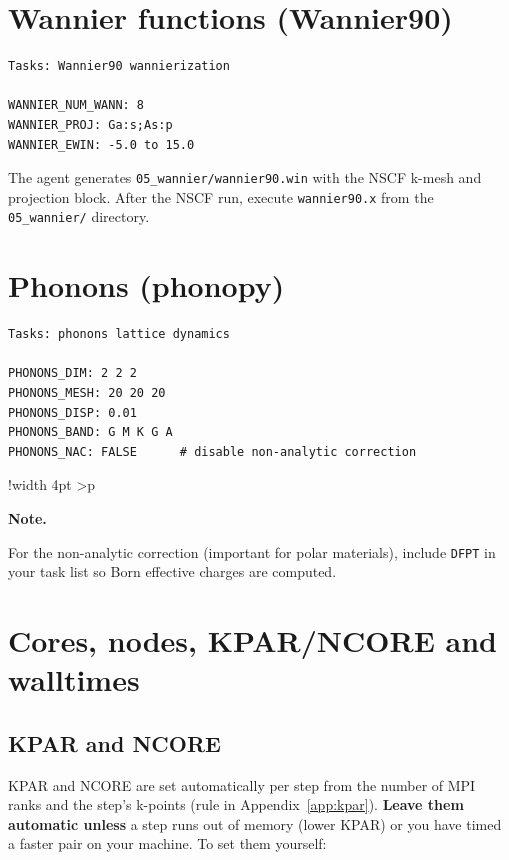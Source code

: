 \documentclass[11pt,a4paper]{scrartcl}
\newlength{\boxwidth}
\newenvironment{notebox}{%
  \par\vspace{6pt}%
  \setlength{\tabcolsep}{5pt}%
  \setlength{\boxwidth}{\dimexpr\linewidth - 4pt - 2\tabcolsep}%
  \noindent\begin{tabular}{!{\color{notebar}\vrule width 4pt}%
      >{\columncolor{notebg}}p{\boxwidth}}%
  \rule{0pt}{11pt}\textbf{\textcolor{notebar}{Note.}}\enspace\ignorespaces%
}{%
  \rule[-4pt]{0pt}{4pt}%
  \end{tabular}\par\vspace{6pt}%
}
\begin{document}
\section{Wannier functions (Wannier90)}
\label{sec:wannier}


\begin{lstlisting}
Tasks: Wannier90 wannierization

WANNIER_NUM_WANN: 8
WANNIER_PROJ: Ga:s;As:p
WANNIER_EWIN: -5.0 to 15.0
\end{lstlisting}

The agent generates \texttt{05\_wannier/wannier90.win} with the NSCF
k-mesh and projection block.  After the NSCF run, execute
\texttt{wannier90.x} from the \texttt{05\_wannier/} directory.

\section{Phonons (phonopy)}
\label{sec:phonons}

\begin{lstlisting}
Tasks: phonons lattice dynamics

PHONONS_DIM: 2 2 2
PHONONS_MESH: 20 20 20
PHONONS_DISP: 0.01
PHONONS_BAND: G M K G A
PHONONS_NAC: FALSE      # disable non-analytic correction
\end{lstlisting}

\begin{notebox}
For the non-analytic correction (important for polar materials), include
\texttt{DFPT} in your task list so Born effective charges are computed.
\end{notebox}

\section{Cores, nodes, KPAR/NCORE and walltimes}
\label{sec:resources}

\subsection{KPAR and NCORE}

KPAR and NCORE are set automatically per step from the number of MPI ranks and the step's k-points (rule in Appendix~\ref{app:kpar}).  \textbf{Leave them automatic unless} a step runs out of memory (lower KPAR) or you have timed a faster pair on your machine.  To set them yourself:
\end{document}
